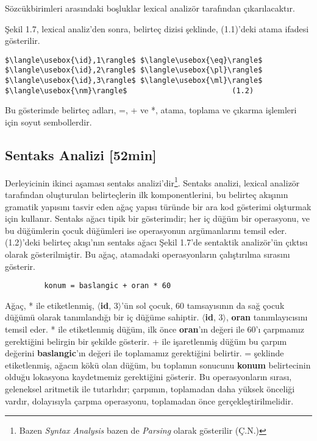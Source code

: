 Sözcükbirimleri arasındaki boşluklar lexical analizör tarafından çıkarılacaktır.

Şekil 1.7, lexical analiz'den sonra, belirteç dizisi şeklinde, (1.1)'deki atama ifadesi gösterilir.
\newsavebox\id
\newsavebox\eq
\newsavebox\pl
\newsavebox\ml
\newsavebox\nm
\savebox{}
\savebox\ml{\lstinline{*}}
\savebox\pl{\lstinline{+}}
\savebox\eq{\lstinline{=}}
\savebox{}



\begin{lstlisting}[mathescape]
 		 $\langle\usebox{\id},1\rangle$ $\langle\usebox{\eq}\rangle$ $\langle\usebox{\id},2\rangle$ $\langle\usebox{\pl}\rangle$ $\langle\usebox{\id},3\rangle$ $\langle\usebox{\ml}\rangle$ $\langle\usebox{\nm}\rangle$			             (1.2)
\end{lstlisting}

Bu gösterimde belirteç adları, =, + ve *, atama, toplama ve çıkarma işlemleri için soyut sembollerdir.


\subsection{Sentaks Analizi [52min]}
Derleyicinin ikinci aşaması sentaks analizi'dir\footnote{Bazen \textit{Syntax Analysis} bazen de \textit{Parsing} olarak gösterilir (Ç.N.)}. Sentaks analizi, lexical analizör tarafından oluşturulan belirteçlerin ilk komponentlerini, bu belirteç akışının gramatik yapısını tasvir eden ağaç yapısı türünde bir ara kod gösterimi olşturmak için kullanır. Sentaks ağacı tipik bir gösterimdir; her iç düğüm bir operasyonu, ve bu düğümlerin çocuk düğümleri ise operasyonun argümanlarını temsil eder. (1.2)'deki belirteç akışı'nın sentaks ağacı Şekil 1.7'de sentaktik analizör'ün çıktısı olarak gösterilmiştir.  Bu ağaç, atamadaki operasyonların çalıştırılma sırasını gösterir.
\begin{lstlisting}
 	     konum = baslangic + oran * 60        
\end{lstlisting}
Ağaç, * ile etiketlenmiş, $\langle$\textbf{id}, 3$\rangle$'ün sol çocuk, 60 tamsayısının da sağ çocuk düğümü olarak tanımlandığı bir iç düğüme sahiptir. $\langle$\textbf{id}, 3$\rangle$, \textbf{oran} tanımlayıcısını temsil eder. * ile etiketlenmiş düğüm, ilk önce \textbf{oran}'ın değeri ile 60'ı çarpmamız gerektiğini belirgin bir şekilde gösterir. + ile işaretlenmiş düğüm bu çarpım değerini \textbf{baslangic}'ın değeri ile toplamamız gerektiğini belirtir. = şeklinde etiketlenmiş, ağacın kökü olan düğüm, bu toplamın sonucunu \textbf{konum} belirtecinin olduğu lokasyona kaydetmemiz gerektiğini gösterir. Bu operasyonların sırası, geleneksel aritmetik ile tutarlıdır; çarpımın, toplamadan daha yüksek önceliği vardır, dolayısıyla çarpma operasyonu, toplamadan önce gerçekleştirilmelidir.

